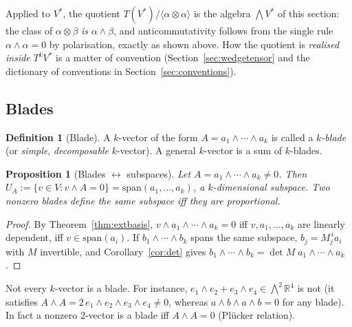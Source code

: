 \documentclass[11pt,a4paper]{article}
\newcounter{thm}[section]
\numberwithin{equation}{section}
\theoremstyle{definition}
\newtheorem{definition}[thm]{Definition}
\theoremstyle{plain}
\newtheorem{proposition}[thm]{Proposition}
\newcommand{\R}{\mathbb{R}}
\newcommand{\Span}{\mathrm{span}}
\begin{document}
\begin{remark}\label{rem:normalisation}
Applied to $V^*$, the quotient $T(V^*)/\langle\alpha\otimes\alpha\rangle$ is the algebra $\bigwedge V^*$ of this section: the
class of $\alpha\otimes\beta$ \emph{is} $\alpha\wedge\beta$, and anticommutativity follows from the single rule $\alpha\wedge\alpha=0$ by
polarisation, exactly as shown above. How the quotient is \emph{realised inside} $T^kV^*$ is a matter of convention
(Section~\ref{sec:wedgetensor} and the dictionary of conventions in Section~\ref{sec:conventions}).
\end{remark}

\subsection{Blades}\label{sec:blades}
\begin{definition}[Blade]
A $k$-vector of the form $A=a_1\wedge\cdots\wedge a_k$ is called a \emph{$k$-blade} (or \emph{simple}, \emph{decomposable} $k$-vector).
A general $k$-vector is a sum of $k$-blades.
\end{definition}

\begin{proposition}[Blades $\leftrightarrow$ subspaces]\label{prop:blade}
Let $A=a_1\wedge\cdots\wedge a_k\neq0$. Then $U_A:=\{v\in V: v\wedge A=0\}=\Span(a_1,\dots,a_k)$, a $k$-dimensional subspace.
Two nonzero blades define the same subspace iff they are proportional.
\end{proposition}
\begin{proof}
By Theorem~\ref{thm:extbasis}, $v\wedge a_1\wedge\cdots\wedge a_k=0$ iff $v,a_1,\dots,a_k$ are linearly dependent, iff $v\in\Span(a_i)$. If $b_1\wedge\cdots\wedge b_k$ spans the same subspace, $b_j=M_j^{\,i}a_i$ with $M$ invertible, and Corollary~\ref{cor:det} gives $b_1\wedge\cdots\wedge b_k=\det M\;a_1\wedge\cdots\wedge a_k$.
\end{proof}

Not every $k$-vector is a blade. For instance, $e_1\wedge e_2+e_3\wedge e_4\in\bigwedge^2\R^4$ is not (it satisfies $A\wedge A=2\,e_1\wedge e_2\wedge e_3\wedge e_4\neq0$, whereas $a\wedge b\wedge a\wedge b=0$ for any blade). In fact a nonzero $2$-vector is a blade iff $A\wedge A=0$ (Pl\"ucker relation).
\end{document}
